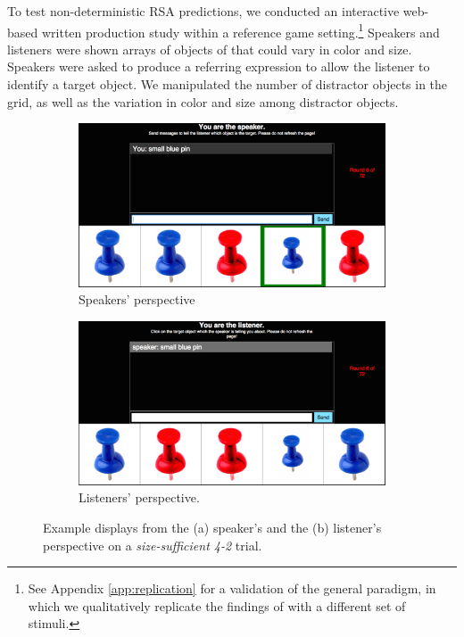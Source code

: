 \documentclass[11pt]{article}
\newcommand{\appref}[1]{Appendix \ref{#1}}
\begin{document}
To test non-deterministic RSA predictions, we conducted an interactive web-based written production study within a reference game setting.\footnote{See \appref{app:replication}  for a validation of the general paradigm, in which we qualitatively replicate the findings of  with a different set of stimuli.} Speakers and listeners were shown arrays of objects of that could vary in color and size. Speakers were asked to produce a referring expression to allow the listener to identify a target object. We manipulated the number of distractor objects in the grid, as well as the variation in color and size among distractor objects.




\begin{figure}
\begin{subfigure}{\textwidth}
\includegraphics[width=\textwidth]{pics/speaker-perspective-small.png}
\caption{Speakers' perspective}
\label{fig:speakerpersp}
\end{subfigure}

\begin{subfigure}{\textwidth}
\includegraphics[width=\textwidth]{pics/listener-perspective-small.png}
\caption{Listeners' perspective.}
\label{fig:listenerpersp}
\end{subfigure}
\caption{Example displays from the  (a) speaker's and the  (b)  listener's perspective on a \emph{size-sufficient 4-2} trial.}
\label{fig:speakerlistenerperspective}
\end{figure}
\end{document}

